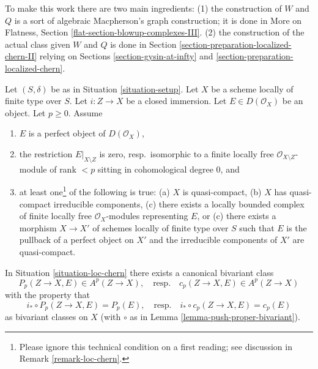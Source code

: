 \medskip\noindent
To make this work there are two main ingredients: (1) the construction of
$W$ and $Q$ is a sort of algebraic Macpherson's graph construction; it
is done in More on Flatness, Section \ref{flat-section-blowup-complexes-III}.
(2) the construction of the actual class given $W$ and $Q$ is done in
Section \ref{section-preparation-localized-chern-II} relying on
Sections \ref{section-gysin-at-infty} and
\ref{section-preparation-localized-chern}.

\begin{situation}
\label{situation-loc-chern}
Let $(S, \delta)$ be as in Situation \ref{situation-setup}. Let $X$ be a scheme
locally of finite type over $S$. Let $i : Z \to X$ be a closed immersion.
Let $E \in D(\mathcal{O}_X)$ be an object. Let $p \geq 0$. Assume
\begin{enumerate}
\item $E$ is a perfect object of $D(\mathcal{O}_X)$,
\item the restriction $E|_{X \setminus Z}$ is zero, resp.\ isomorphic to a
finite locally free $\mathcal{O}_{X \setminus Z}$-module of rank $< p$
sitting in cohomological degree $0$, and
\item at least one\footnote{Please ignore this technical condition on a
first reading; see discussion in Remark \ref{remark-loc-chern}.}
of the following is true:
(a) $X$ is quasi-compact,
(b) $X$ has quasi-compact irreducible components,
(c) there exists a locally bounded complex of finite locally free
$\mathcal{O}_X$-modules representing $E$, or
(c) there exists a morphism $X \to X'$ of schemes locally of finite type
over $S$ such that $E$ is the pullback of a perfect object on $X'$ and
the irreducible components of $X'$ are quasi-compact.
\end{enumerate}
\end{situation}

\begin{lemma}
\label{lemma-independent-loc-chern}
In Situation \ref{situation-loc-chern} there exists a canonical bivariant class
$$
P_p(Z \to X, E) \in A^p(Z \to X),
\quad\text{resp.}\quad
c_p(Z \to X, E) \in A^p(Z \to X)
$$
with the property that
\begin{equation}
\label{equation-defining-property-localized-classes}
i_* \circ P_p(Z \to X, E) = P_p(E),
\quad\text{resp.}\quad
i_* \circ c_p(Z \to X, E) = c_p(E)
\end{equation}
as bivariant classes on $X$ (with $\circ$ as in
Lemma \ref{lemma-push-proper-bivariant}).
\end{lemma}

